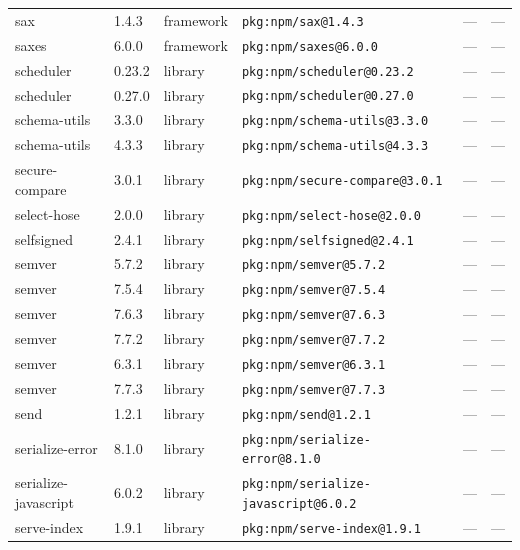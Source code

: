 \documentclass[11pt,a4paper]{article}
\begin{document}
\begin{longtable}{|p{4cm}|p{2cm}|p{1.6cm}|p{5cm}|p{1.5cm}|p{3.5cm}|}
\raggedright sax & 1.4.3 & framework & \small\texttt{pkg:npm/sax@1.4.3} & — & \small — \\
\raggedright saxes & 6.0.0 & framework & \small\texttt{pkg:npm/saxes@6.0.0} & — & \small — \\
\raggedright scheduler & 0.23.2 & library & \small\texttt{pkg:npm/scheduler@0.23.2} & — & \small — \\
\raggedright scheduler & 0.27.0 & library & \small\texttt{pkg:npm/scheduler@0.27.0} & — & \small — \\
\raggedright schema-utils & 3.3.0 & library & \small\texttt{pkg:npm/schema-utils@3.3.0} & — & \small — \\
\raggedright schema-utils & 4.3.3 & library & \small\texttt{pkg:npm/schema-utils@4.3.3} & — & \small — \\
\raggedright secure-compare & 3.0.1 & library & \small\texttt{pkg:npm/secure-compare@3.0.1} & — & \small — \\
\raggedright select-hose & 2.0.0 & library & \small\texttt{pkg:npm/select-hose@2.0.0} & — & \small — \\
\raggedright selfsigned & 2.4.1 & library & \small\texttt{pkg:npm/selfsigned@2.4.1} & — & \small — \\
\raggedright semver & 5.7.2 & library & \small\texttt{pkg:npm/semver@5.7.2} & — & \small — \\
\raggedright semver & 7.5.4 & library & \small\texttt{pkg:npm/semver@7.5.4} & — & \small — \\
\raggedright semver & 7.6.3 & library & \small\texttt{pkg:npm/semver@7.6.3} & — & \small — \\
\raggedright semver & 7.7.2 & library & \small\texttt{pkg:npm/semver@7.7.2} & — & \small — \\
\raggedright semver & 6.3.1 & library & \small\texttt{pkg:npm/semver@6.3.1} & — & \small — \\
\raggedright semver & 7.7.3 & library & \small\texttt{pkg:npm/semver@7.7.3} & — & \small — \\
\raggedright send & 1.2.1 & library & \small\texttt{pkg:npm/send@1.2.1} & — & \small — \\
\raggedright serialize-error & 8.1.0 & library & \small\texttt{pkg:npm/serialize-error@8.1.0} & — & \small — \\
\raggedright serialize-javascript & 6.0.2 & library & \small\texttt{pkg:npm/serialize-javascript@6.0.2} & — & \small — \\
\raggedright serve-index & 1.9.1 & library & \small\texttt{pkg:npm/serve-index@1.9.1} & — & \small — \\

\end{longtable}
\end{document}
